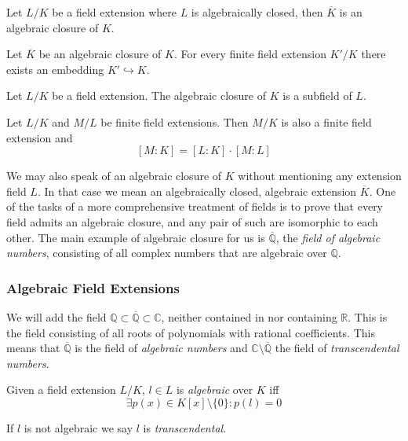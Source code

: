 \begin{proposition}
   Let \(L/K\) be a field extension where \(L\) is algebraically closed, then \(\overline{K}\) is an algebraic closure of \(K\).
\end{proposition}

\begin{proposition}
   Let \(\overline{K}\) be an algebraic closure of \(K\).
   For every finite field extension \(K'/K\) there exists an embedding \(K' \hookrightarrow K\).
\end{proposition}

\begin{proposition}
   Let \(L/K\) be a field extension.
   The algebraic closure of \(K\) is a subfield of \(L\).
\end{proposition}

\begin{proposition}
   Let \(L/K\) and \(M/L\) be finite field extensions.
   Then \(M/K\) is also a finite field extension and
   \[[M:K] = [L:K] \cdot [M:L]\]
\end{proposition}

We may also speak of an algebraic closure of \(K\) without mentioning any extension field \(L\).
In that case we mean an algebraically closed, algebraic extension \(\overline{K}\).
One of the tasks of a more comprehensive treatment of fields is to prove that every field admits an algebraic closure, and any pair of such are isomorphic to each other.
The main example of algebraic closure for us is \(\overline{\mathbb{Q}}\), the \emph{field of algebraic numbers}, consisting of all complex numbers that are algebraic over \(\mathbb{Q}\).

\subsubsection{Algebraic Field Extensions}
We will add the field \(\mathbb{Q} \subset \overline{\mathbb{Q}} \subset \mathbb{C}\), neither contained in nor containing \(\mathbb{R}\).
This is the field consisting of all roots of polynomials with rational coefficients.
This means that \(\overline{\mathbb{Q}}\) is the field of \emph{algebraic numbers} and \(\mathbb{C} \setminus \overline{\mathbb{Q}}\) the field of \emph{transcendental numbers}.

\begin{definition}
   Given a field extension \(L/K\), \(l \in L\) is \emph{algebraic} over \(K\) iff
   \[\exists p(x) \in K[x] \setminus \{0\}: p(l) = 0\]
\end{definition}
\begin{remark}[Terminology]
   If \(l\) is not algebraic we say \(l\) is \emph{transcendental}.
\end{remark}

